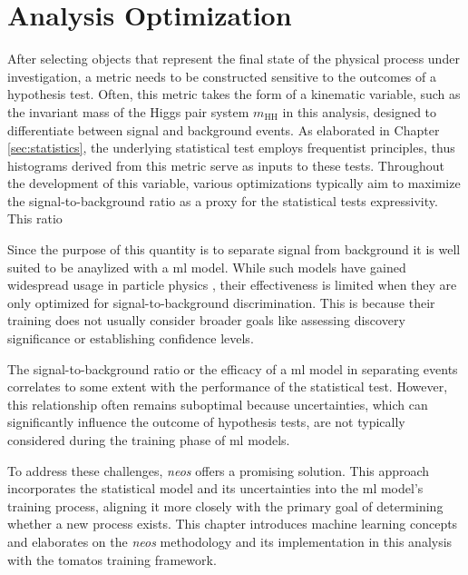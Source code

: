 \chapter{Analysis Optimization}\label{sec:analysis_optimization}

After selecting objects that represent the final state of the physical process under investigation, a metric needs to be constructed sensitive to the outcomes of a hypothesis test. Often, this metric takes the form of a kinematic variable, such as the invariant mass of the Higgs pair system $m_\text{HH}$ in this analysis, designed to differentiate between signal and background events. As elaborated in Chapter \ref{sec:statistics}, the underlying statistical test employs frequentist principles, thus histograms derived from this metric serve as inputs to these tests. Throughout the development of this variable, various optimizations typically aim to maximize the signal-to-background ratio as a proxy for the statistical tests expressivity. This ratio

Since the purpose of this quantity is to separate signal from background it is well suited to be anaylized with a \ac{ml} model. While such models have gained widespread usage in particle physics \citep{albertsson2019machine,shlomi2020graph,feickert2021living,Schwartz2021Modern}, their effectiveness is limited when they are only optimized for signal-to-background discrimination. This is because their training does not usually consider broader goals like assessing discovery significance or establishing confidence levels.

The signal-to-background ratio or the efficacy of a \ac{ml} model in separating events correlates to some extent with the performance of the statistical test. However, this relationship often remains suboptimal because uncertainties, which can significantly influence the outcome of hypothesis tests, are not typically considered during the training phase of \ac{ml} models.

To address these challenges, \textit{\ac{neos}} \citep{Simpson_2023} offers a promising solution. This approach incorporates the statistical model and its uncertainties into the \ac{ml} model's training process, aligning it more closely with the primary goal of determining whether a new process exists. This chapter introduces machine learning concepts and elaborates on the \textit{\ac{neos}} methodology and its implementation in this analysis with the \ac{tomatos} training framework.

